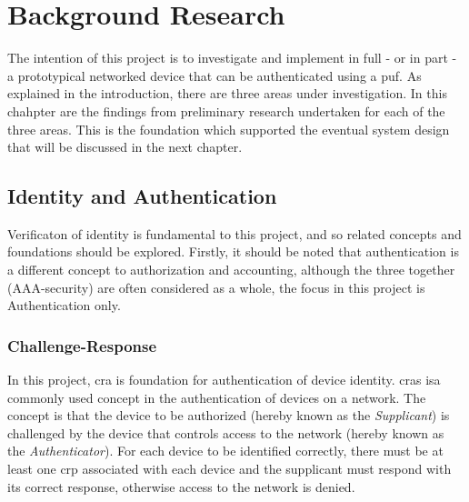 
\chapter{Background Research} %

\label{ch:background} %


The intention of this project is to investigate and implement in full - or in
part - a prototypical networked device that can be authenticated using a \gls{puf}.
As explained in the introduction, there are three areas under investigation.
In this chahpter are the findings from preliminary research undertaken for each
of the three areas. This is the foundation which supported the eventual system
design that will be discussed in the next chapter.

\section{Identity and Authentication}

Verificaton of identity is fundamental to this project, and so related concepts
and foundations should be explored. Firstly, it should be noted that
authentication is a different concept to authorization and accounting, although
the three together (AAA-security) are often considered as a whole, the focus in
this project is Authentication only.

\subsection{Challenge-Response}

In this project, \gls{cra} is foundation for authentication of device identity.
\Glspl{cra} isa commonly used concept in the authentication of devices on a
network. The concept is that the device to be authorized (hereby known as the
\emph{Supplicant}) is challenged by the device that controls access to the
network (hereby known as the \emph{Authenticator}). For each device to be identified
correctly, there must be at least one \gls{crp} associated with
each device and the supplicant must respond
with its correct response, otherwise access to the network is denied.

